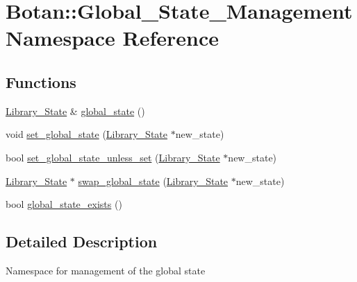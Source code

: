 \hypertarget{namespaceBotan_1_1Global__State__Management}{\section{Botan\-:\-:Global\-\_\-\-State\-\_\-\-Management Namespace Reference}
\label{namespaceBotan_1_1Global__State__Management}
}
\subsection*{Functions}
\begin{DoxyCompactItemize}
\item 
\hyperlink{classBotan_1_1Library__State}{Library\-\_\-\-State} \& \hyperlink{namespaceBotan_1_1Global__State__Management_ab58f33e6885a7aa905a9291578408c84}{global\-\_\-state} ()
\item 
void \hyperlink{namespaceBotan_1_1Global__State__Management_a8c28c0da3fe7fa017521cafeccc1425f}{set\-\_\-global\-\_\-state} (\hyperlink{classBotan_1_1Library__State}{Library\-\_\-\-State} $\ast$new\-\_\-state)
\item 
bool \hyperlink{namespaceBotan_1_1Global__State__Management_a7da7a309df42621ce768e5d959b69e7b}{set\-\_\-global\-\_\-state\-\_\-unless\-\_\-set} (\hyperlink{classBotan_1_1Library__State}{Library\-\_\-\-State} $\ast$new\-\_\-state)
\item 
\hyperlink{classBotan_1_1Library__State}{Library\-\_\-\-State} $\ast$ \hyperlink{namespaceBotan_1_1Global__State__Management_a5c346237ce90126dc0ae9652020d0239}{swap\-\_\-global\-\_\-state} (\hyperlink{classBotan_1_1Library__State}{Library\-\_\-\-State} $\ast$new\-\_\-state)
\item 
bool \hyperlink{namespaceBotan_1_1Global__State__Management_a47668ba931be3511b55a7f4f88dcac7d}{global\-\_\-state\-\_\-exists} ()
\end{DoxyCompactItemize}


\subsection{Detailed Description}
Namespace for management of the global state 

